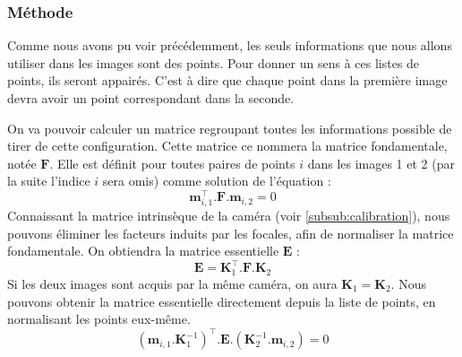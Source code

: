 \subsubsection{Méthode}
\label{subsub:reconstruction}

Comme nous avons pu voir précédemment, les seuls informations que nous allons utiliser dans les images sont des points.
Pour donner un sens à ces listes de points, ils seront appairés.
C'est à dire que chaque point dans la première image devra avoir un point correspondant dans la seconde.

On va pouvoir calculer un matrice regroupant toutes les informations possible de tirer de cette configuration.
Cette matrice ce nommera la matrice fondamentale, notée $\mathbf{F}$.
Elle est définit pour toutes paires de points $i$ dans les images 1 et 2 (par la suite l'indice $i$ sera omis) comme solution de l'équation :
\begin{equation}
\mathbf{m}_{i,1}^ \top.\mathbf{F}.\mathbf{m}_{i,2} = 0
\label{eq:fondamentale}
\end{equation}
Connaissant la matrice intrinsèque de la caméra (voir \ref{subsub:calibration}), nous pouvons éliminer les facteurs induits par les focales, afin de normaliser la matrice fondamentale.
On obtiendra la matrice essentielle $\mathbf{E}$ :
\begin{equation}
\mathbf{E} = \mathbf{K}_1^{\top} . \mathbf{F} . \mathbf{K}_2
\end{equation}
Si les deux images sont acquis par la même caméra, on aura $\mathbf{K}_1 = \mathbf{K}_2$.
Nous pouvons obtenir la matrice essentielle directement depuis la liste de points, en normalisant les points eux-même.
\begin{equation}
(\mathbf{m}_{i,1}.\mathbf{K}_1^{-1})^\top.\mathbf{E}.(\mathbf{K}_2^{-1}.\mathbf{m}_{i,2}) = 0
\label{eq:essentielle}
\end{equation}


